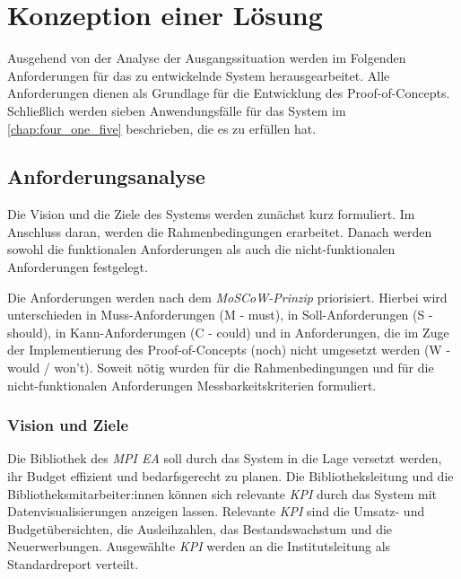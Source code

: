 \chapter{Konzeption einer Lösung}
\label{chap:four}
Ausgehend von der Analyse der Ausgangssituation werden im Folgenden 
Anforderungen für das zu entwickelnde System herausgearbeitet.
Alle Anforderungen dienen als Grundlage für die Entwicklung des Proof-of-Concepts. 
Schließlich werden sieben Anwendungsfälle für das System im \autoref{chap:four_one_five} beschrieben, die es zu erfüllen hat.


\section{Anforderungsanalyse}
Die Vision und die Ziele des Systems werden zunächst kurz formuliert. Im Anschluss daran, werden die Rahmenbedingungen erarbeitet. Danach werden sowohl die funktionalen Anforderungen als
auch die nicht-funktionalen Anforderungen festgelegt. 


Die Anforderungen werden nach dem \textit{MoSCoW-Prinzip} priorisiert. 
Hierbei wird unterschieden in Muss-Anforderungen (M - must), in Soll-Anforderungen (S - should), in Kann-Anforderungen (C - could) und in Anforderungen,
die im Zuge der Implementierung des Proof-of-Concepts (noch) nicht umgesetzt werden (W - would / won't).
Soweit nötig wurden für die Rahmenbedingungen und für die nicht-funktionalen Anforderungen Messbarkeitskriterien formuliert. 

\subsection{Vision und Ziele}
Die Bibliothek des \textit{\acrshort{MPI EA}} soll durch das System in die Lage versetzt werden, ihr Budget effizient und bedarfsgerecht zu planen.
Die Bibliotheksleitung und die Bibliotheksmitarbeiter:innen können sich relevante \textit{\acrlong{KPI}} durch das System mit
Datenvisualisierungen anzeigen lassen. Relevante \textit{\acrshort{KPI}} sind die Umsatz- und Budgetübersichten, die Ausleihzahlen, das Bestandswachstum und die
Neuerwerbungen. 
Ausgewählte \textit{\acrshort{KPI}} werden an die Institutsleitung als Standardreport verteilt.

